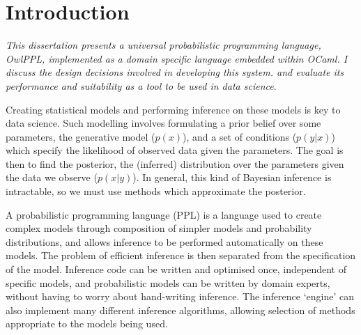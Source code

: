 \documentclass[sigconf]{acmart}
\begin{document}


\maketitle

\section{Introduction}
\label{s:introduction}

\textit{This dissertation presents a universal probabilistic programming language, OwlPPL, implemented as a domain specific language embedded within OCaml. I discuss the design decisions involved in developing this system. and evaluate its performance and suitability as a tool to be used in data science}.

Creating statistical models and performing inference on these models is key to data science. Such modelling involves formulating a prior belief over some parameters, the generative model ($p(x)$), and a set of conditions ($p(y|x)$) which specify the likelihood of observed data given the parameters. The goal is then to find the posterior, the (inferred) distribution over the parameters given the data we observe ($p(x|y)$). In general, this kind of Bayesian inference is intractable, so we must use methods which approximate the posterior.

A probabilistic programming language (PPL) is a language used to create complex models through composition of simpler models and probability distributions, and allows inference to be performed automatically on these models. The problem of efficient inference is then separated from the specification of the model. Inference code can be written and optimised once, independent of specific models, and probabilistic models can be written by domain experts, without having to worry about hand-writing inference. The inference `engine' can also implement many different inference algorithms, allowing selection of methods appropriate to the models being used.
\end{document}
